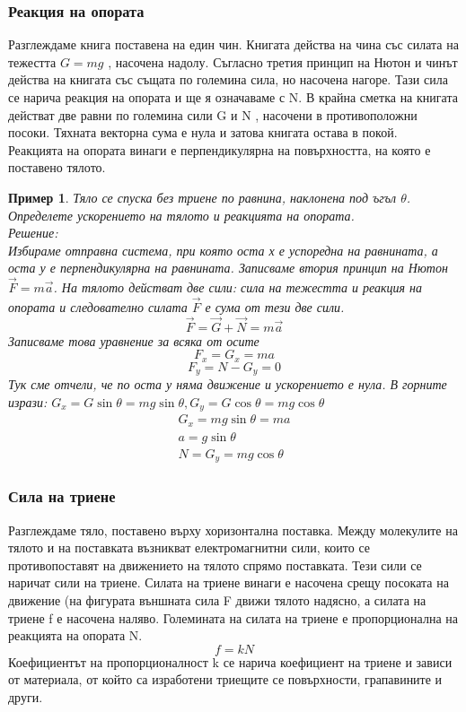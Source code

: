 \documentclass[fleqn, 12pt]{article}
\newtheorem{example}{Пример}[subsection]
\begin{document}
\subsubsection{Реакция на опората}
Разглеждаме книга поставена на един чин. Книгата действа на чина със силата на тежестта $G = mg$ , насочена надолу. Съгласно третия принцип на Нютон и чинът действа на книгата със същата по големина сила, но насочена нагоре. Тази сила се нарича реакция на опората и ще я означаваме с N. В крайна сметка на книгата действат две равни по големина сили G и N , насочени в противоположни посоки. Тяхната векторна сума е нула и затова книгата остава в покой. \\
Реакцията на опората винаги е перпендикулярна на повърхността, на която е поставено тялото.
 
\begin{example}
Тяло се спуска без триене по равнина, наклонена под ъгъл $\theta$. Определете ускорението на тялото и реакцията на опората. \\
Решение: \\
Избираме отправна система, при която оста х е успоредна на равнината, а оста у е перпендикулярна на равнината. Записваме втория принцип на Нютон $\vec{F} = m \vec{a}$. На тялото действат две сили: сила на тежестта и реакция на опората и следователно силата $\vec{F}$ е сума от тези две сили.
$$\vec{F} = \vec{G} + \vec{N} = m \vec{a} $$
Записваме това уравнение за всяка от осите
$$F_x = G_x = ma$$
$$F_y = N - G_y = 0$$
Тук сме отчели, че по оста у няма движение и ускорението е нула. В горните изрази: $G_x  =G \sin{\theta} = mg \sin{\theta}, G_y  =G \cos{\theta} = mg \cos{\theta}$\\
\begin{gather*}
G_x = mg \sin{\theta} = ma\\
a =g\sin{\theta}\\
N = G_y = mg \cos{\theta}
\end{gather*}
\end{example}

\subsubsection{Сила на триене}
Разглеждаме тяло, поставено върху хоризонтална поставка. Между молекулите на тялото и на поставката възникват електромагнитни сили, които се противопоставят на движението на тялото спрямо поставката. Тези сили се наричат сили на триене. Силата на триене винаги е насочена срещу посоката на движение (на фигурата външната сила F движи тялото надясно, а силата на триене f е насочена наляво. Големината на силата на триене е пропорционална на реакцията на опората N.
$$f = kN$$
Коефициентът на пропорционалност k се нарича коефициент на триене и зависи от материала, от който са изработени триещите се повърхности, грапавините и други.
\end{document}
